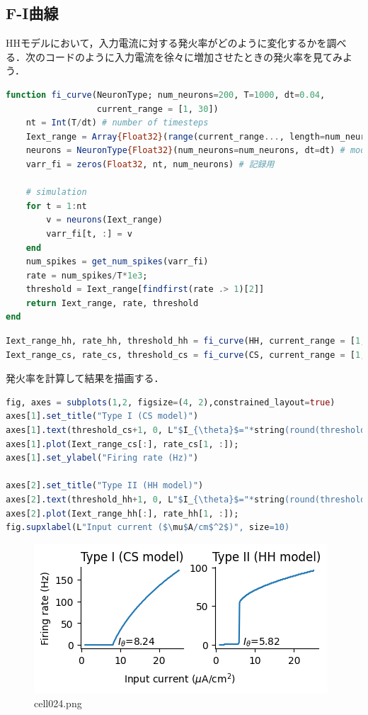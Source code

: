 \subsection{F-I曲線}
HHモデルにおいて，入力電流に対する発火率がどのように変化するかを調べる．次のコードのように入力電流を徐々に増加させたときの発火率を見てみよう．
\begin{lstlisting}[language=julia]
function fi_curve(NeuronType; num_neurons=200, T=1000, dt=0.04,
                  current_range = [1, 30])
    nt = Int(T/dt) # number of timesteps
    Iext_range = Array{Float32}(range(current_range..., length=num_neurons)) # injection current
    neurons = NeuronType{Float32}(num_neurons=num_neurons, dt=dt) # modelの定義
    varr_fi = zeros(Float32, nt, num_neurons) # 記録用

    # simulation
    for t = 1:nt
        v = neurons(Iext_range)
        varr_fi[t, :] = v
    end
    num_spikes = get_num_spikes(varr_fi)
    rate = num_spikes/T*1e3;
    threshold = Iext_range[findfirst(rate .> 1)[2]]
    return Iext_range, rate, threshold
end
\end{lstlisting}
\begin{lstlisting}[language=julia]
Iext_range_hh, rate_hh, threshold_hh = fi_curve(HH, current_range = [1, 25])
Iext_range_cs, rate_cs, threshold_cs = fi_curve(CS, current_range = [1, 25]);
\end{lstlisting}
発火率を計算して結果を描画する．
\begin{lstlisting}[language=julia]
fig, axes = subplots(1,2, figsize=(4, 2),constrained_layout=true) 
axes[1].set_title("Type I (CS model)")
axes[1].text(threshold_cs+1, 0, L"$I_{\theta}$="*string(round(threshold_cs, digits=2)))
axes[1].plot(Iext_range_cs[:], rate_cs[1, :]); 
axes[1].set_ylabel("Firing rate (Hz)")

axes[2].set_title("Type II (HH model)")
axes[2].text(threshold_hh+1, 0, L"$I_{\theta}$="*string(round(threshold_hh, digits=2)))
axes[2].plot(Iext_range_hh[:], rate_hh[1, :]); 
fig.supxlabel(L"Input current ($\mu$A/cm$^2$)", size=10)
\end{lstlisting}
\begin{figure}[ht]
	\centering
	\includegraphics[scale=0.8, max width=\linewidth]{./fig/neuron-model/hodgkin-huxley/cell024.png}
	\caption{cell024.png}
	\label{cell024.png}
\end{figure}

